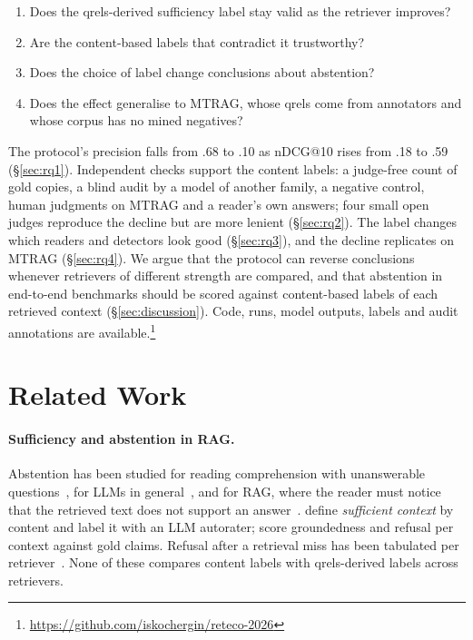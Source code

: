 \documentclass[11pt]{article}
\begin{document}
\begin{enumerate}[label=\textbf{RQ\arabic*},widest=4,leftmargin=*,align=left,labelsep=0.5em]
\item Does the qrels-derived sufficiency label stay valid as the retriever improves?
\item Are the content-based labels that contradict it trustworthy?
\item Does the choice of label change conclusions about abstention?
\item Does the effect generalise to MTRAG, whose qrels come from annotators and whose corpus has no mined negatives?
\end{enumerate}

The protocol's precision falls from .68 to .10 as nDCG@10 rises from .18 to .59 (\S\ref{sec:rq1}). Independent checks support the content labels: a judge-free count of gold copies, a blind audit by a model of another family, a negative control, human judgments on MTRAG and a reader's own answers; four small open judges reproduce the decline but are more lenient (\S\ref{sec:rq2}). The label changes which readers and detectors look good (\S\ref{sec:rq3}), and the decline replicates on MTRAG (\S\ref{sec:rq4}). We argue that the protocol can reverse conclusions whenever retrievers of different strength are compared, and that abstention in end-to-end benchmarks should be scored against content-based labels of each retrieved context (\S\ref{sec:discussion}). Code, runs, model outputs, labels and audit annotations are available.\footnote{\url{https://github.com/iskochergin/reteco-2026}}

\section{Related Work}

\paragraph{Sufficiency and abstention in RAG.}
Abstention has been studied for reading comprehension with unanswerable questions~\cite{rajpurkar2018know,trivedi2022musique}, for LLMs in general~\cite{wen2025know,kirichenko2025abstentionbench}, and for RAG, where the reader must notice that the retrieved text does not support an answer~\cite{chen2024benchmarking,peng2025unanswerability}. \citet{joren2025sufficient} define \emph{sufficient context} by content and label it with an LLM autorater; \citet{song2025trustscore} score groundedness and refusal per context against gold claims. Refusal after a retrieval miss has been tabulated per retriever~\cite{vondaniken2026rat}. None of these compares content labels with qrels-derived labels across retrievers.
\end{document}
